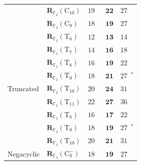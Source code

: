 \documentclass[11pt]{article}
\theoremstyle{definition}
\newcommand{\F}{\mathbb{F}}
\newcommand{\Rk}[2]{\mathbf{R}_{#1}(#2)}
\newcommand{\Cyct}[1]{\mathrm{C}_{#1}}
\newcommand{\Trunct}[1]{\mathrm{T}_{#1}}
\newcommand{\Negat}[1]{\mathrm{C}^{-}_{#1}}
\begin{document}
\begin{table}[!ht]
\begin{tabular}{lllll}
    & $\Rk{\F_2}{\Cyct{10}}$     & $19$~\cite{averbuch1988classification,blaser2005complete}                     & $\mathbf{22}$ & $27$~\cite{randriambololona2012bilinear}                        \\
    & $\Rk{\F_3}{\Cyct{9}}$      & $18$~\cite{averbuch1991classification,blaser2005complete}                     & $\mathbf{19}$ & $27$~\cite{cenk2011multiplication} \\
    \midrule
    \multirow{9}{*}{Truncated}
    & $\Rk{\F_2}{\Trunct{6}}$    & $12$~\cite{averbuch1991classification,blaser2005complete}                     & $\mathbf{13}$ & $14$~\cite{cenk2011multiplication}                           \\
    & $\Rk{\F_2}{\Trunct{7}}$    & $14$~\cite{averbuch1991classification,blaser2005complete}                     & $\mathbf{16}$ & $18$~\cite{cenk2011multiplication}                           \\
    & $\Rk{\F_2}{\Trunct{8}}$    & $16$~\cite{averbuch1991classification,blaser2005complete}                     & $\mathbf{19}$ & $22$~\cite{cenk2011multiplication}                           \\
    & $\Rk{\F_2}{\Trunct{9}}$    & $18$~\cite{averbuch1991classification,blaser2005complete}                     & $\mathbf{21}$ & $27$~\cite{cenk2011multiplication}$^\ast$                    \\
    & $\Rk{\F_2}{\Trunct{10}}$   & $20$~\cite{averbuch1991classification,blaser2005complete}                     & $\mathbf{24}$ & $31$~\cite{cenk2011multiplication}                           \\
    & $\Rk{\F_2}{\Trunct{11}}$   & $22$~\cite{averbuch1991classification,blaser2005complete}                     & $\mathbf{27}$ & $36$~\cite{cenk2011multiplication}                           \\
    & $\Rk{\F_3}{\Trunct{8}}$    & $16$~\cite{averbuch1991classification,blaser2005complete}                     & $\mathbf{17}$ & $22$~\cite{cenk2011multiplication}                           \\
    & $\Rk{\F_3}{\Trunct{9}}$    & $18$~\cite{averbuch1991classification,blaser2005complete}                     & $\mathbf{19}$ & $27$~\cite{cenk2011multiplication}$^\ast$                          \\
    & $\Rk{\F_3}{\Trunct{10}}$   & $20$~\cite{averbuch1991classification,blaser2005complete}                     & $\mathbf{21}$ & $31$~\cite{cenk2011multiplication}                                 \\
    \midrule
    Negacyclic
    & $\Rk{\F_3}{\Negat{9}}$     & $18$~\cite{averbuch1991classification,blaser2005complete}                     & $\mathbf{19}$ & $27$~\cite{cenk2011multiplication}                           \\
    \bottomrule
  \end{tabular}


\end{table}
\end{document}
